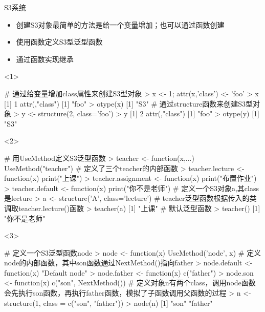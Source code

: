 \begin{frame}[t,fragile]{\subsecname}{S3系统}
  \begin{itemize}
  \item<1-> 创建S3对象最简单的方法是给一个变量增加；也可以通过函数创建
  \item<2-> 使用函数定义S3型泛型函数
  \item<3-> 通过函数实现继承
  \end{itemize}  

\begin{overlayarea}{\textwidth}{0.5\textheight}
\begin{onlyenv}<1>
\begin{rcode}
# 通过给变量增加class属性来创建S3型对象
> x <- 1; attr(x,'class') <- 'foo'
> x
[1] 1
attr(,"class")
[1] "foo"
> otype(x)
[1] "S3"
# 通过structure函数来创建S3型对象
> y <- structure(2, class='foo')
> y
[1] 2
attr(,"class")
[1] "foo"
> otype(y)
[1] "S3"
\end{rcode}  
\end{onlyenv}

\begin{onlyenv}<2>
\begin{rcode}
# 用UseMethod定义S3泛型函数
> teacher <- function(x,...) UseMethod("teacher")
# 定义了三个teacher的内部函数
> teacher.lecture <- function(x) print("上课")
> teacher.assignment <- function(x) print("布置作业")
> teacher.default <- function(x) print("你不是老师")
# 定义一个S3对象a,其class是lecture
> a <- structure('A', class='lecture')
# teacher泛型函数根据传入的类调取teacher.lecture()函数
> teacher(a) 
[1] "上课"
# 默认泛型函数
> teacher()
[1] "你不是老师"
\end{rcode}  
\end{onlyenv}

\begin{onlyenv}<3>
\begin{rcode}
# 定义一个S3泛型函数node
> node <- function(x) UseMethod('node', x)
# 定义node的内部函数，其中son函数通过NextMethod()指向father
> node.default <- function(x) "Default node"
> node.father <- function(x) c("father")
> node.son <- function(x) c("son", NextMethod())
# 定义对象n有两个class，调用node函数会先执行son函数，再执行father函数，模拟了子函数调用父函数的过程
> n <- structure(1, class = c("son", "father"))
> node(n)
[1] "son"    "father"
\end{rcode}
\end{onlyenv}


\end{overlayarea}
\end{frame}
